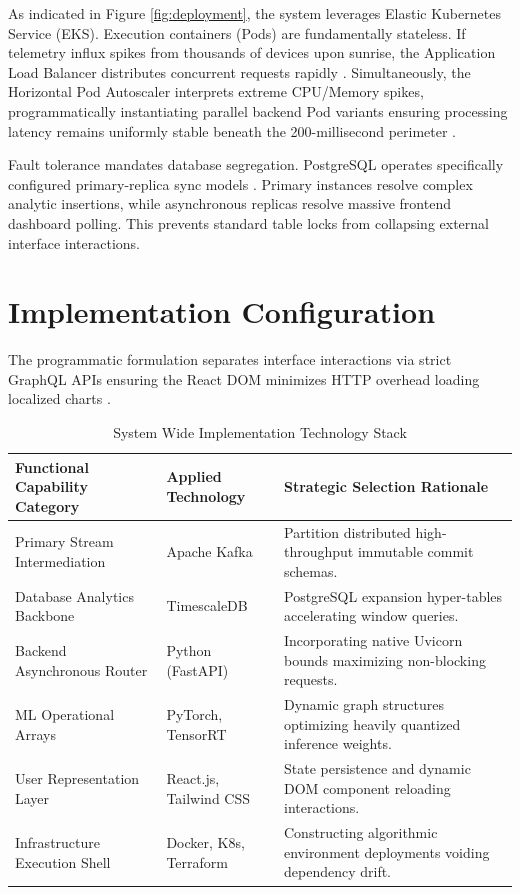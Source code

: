 \documentclass[12pt, a4paper]{report}
\begin{document}
As indicated in Figure \ref{fig:deployment}, the system leverages Elastic Kubernetes Service (EKS). Execution containers (Pods) are fundamentally stateless. If telemetry influx spikes from thousands of devices upon sunrise, the Application Load Balancer distributes concurrent requests rapidly \cite{r27}. Simultaneously, the Horizontal Pod Autoscaler interprets extreme CPU/Memory spikes, programmatically instantiating parallel backend Pod variants ensuring processing latency remains uniformly stable beneath the 200-millisecond perimeter \cite{r28}.

Fault tolerance mandates database segregation. PostgreSQL operates specifically configured primary-replica sync models \cite{r29}. Primary instances resolve complex analytic insertions, while asynchronous replicas resolve massive frontend dashboard polling. This prevents standard table locks from collapsing external interface interactions.

\chapter{Implementation Configuration}

The programmatic formulation separates interface interactions via strict GraphQL APIs ensuring the React DOM minimizes HTTP overhead loading localized charts \cite{r30}.

\begin{table}[H]
\centering
\caption{System Wide Implementation Technology Stack}
\begin{tabular}{@{}llp{8cm}@{}}
\toprule
\textbf{Functional Capability Category} & \textbf{Applied Technology} & \textbf{Strategic Selection Rationale} \\ \midrule
Primary Stream Intermediation & Apache Kafka & Partition distributed high-throughput immutable commit schemas. \\
Database Analytics Backbone & TimescaleDB & PostgreSQL expansion hyper-tables accelerating window queries. \\
Backend Asynchronous Router & Python (FastAPI) & Incorporating native Uvicorn bounds maximizing non-blocking requests. \\
ML Operational Arrays & PyTorch, TensorRT & Dynamic graph structures optimizing heavily quantized inference weights. \\
User Representation Layer & React.js, Tailwind CSS & State persistence and dynamic DOM component reloading interactions. \\
Infrastructure Execution Shell & Docker, K8s, Terraform & Constructing algorithmic environment deployments voiding dependency drift. \\ \bottomrule
\end{tabular}
\end{table}
\end{document}
